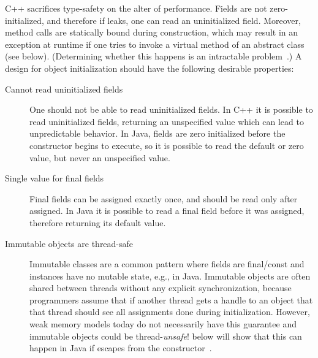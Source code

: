\mbox{C++} sacrifices type-safety on the alter of performance. %
Fields are not zero-initialized, and therefore if \this leaks,
    one can read an uninitialized field.
Moreover, method calls are statically bound during construction,
    which may result in an exception at runtime
    if one tries to invoke a virtual method of an abstract class (see  below).
(Determining whether this happens is an intractable problem~\cite{Gil:1998:CTA:646155.679689}.)
A design for object initialization should have the following
    desirable properties:
\begin{description}

  \item[Cannot read uninitialized fields]
    One should not be able to read uninitialized fields.
    In \mbox{C++} it is possible to read uninitialized fields,
        returning an unspecified value which can lead to unpredictable behavior.
    In Java, fields are zero initialized before the constructor begins to execute,
        so it is possible to read the default or zero value,
        but never an unspecified value.

  \item[Single value for final fields]
    Final fields can be assigned exactly once, and
        should be read only after assigned.
    In Java it is possible to read a final field before it was assigned,
        therefore returning its default value.

  \item[Immutable objects are thread-safe]
    Immutable classes are a common pattern where fields are final/const
        and instances have no mutable state, e.g.,  in Java.
    Immutable objects are often shared between threads without any explicit synchronization,
        because programmers assume that if another thread gets a handle to an object
        that that thread should see all assignments done during initialization.
    However, weak memory models today do not necessarily have this guarantee
        and immutable objects could be thread-\emph{unsafe}!
     below will show that this can happen in Java
        if \this escapes from the constructor~\cite{JSR133}.


\end{description}
